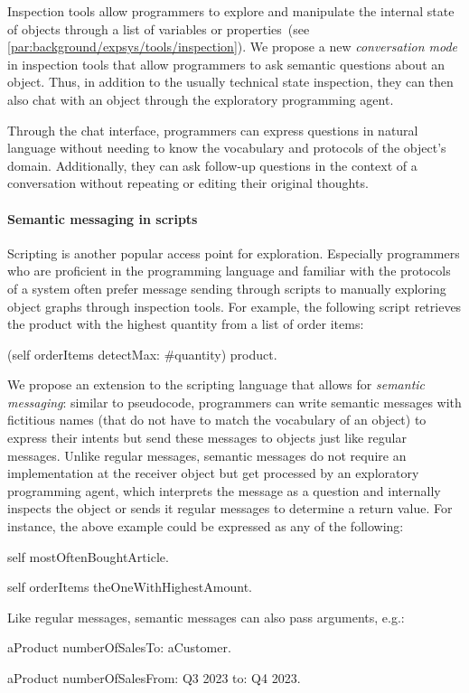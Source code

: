 Inspection tools allow programmers to explore and manipulate the internal state of objects through a list of variables or properties~(see \cref{par:background/expsys/tools/inspection}).
We propose a new \emph{conversation mode} in inspection tools that allow programmers to ask semantic questions about an object.
Thus, in addition to the usually technical state inspection, they can then also chat with an object through the exploratory programming agent.

Through the chat interface, programmers can express questions in natural language without needing to know the vocabulary and protocols of the object's domain.
Additionally, they can ask follow-up questions in the context of a conversation without repeating or editing their original thoughts.

\paragraph{Semantic messaging in scripts}
\label{par:design/agent/interfaces/messaging}

Scripting is another popular access point for exploration.
Especially programmers who are proficient in the programming language and familiar with the protocols of a system often prefer message sending through scripts to manually exploring object graphs through inspection tools.
For example, the following script retrieves the product with the highest quantity from a list of order items:

\begin{multicode}
	(self orderItems detectMax: \#quantity) product.
\end{multicode}

We propose an extension to the scripting language that allows for \emph{semantic messaging}: similar to pseudocode, programmers can write semantic messages with fictitious names (that do not have to match the vocabulary of an object) to express their intents but send these messages to objects just like regular messages.
Unlike regular messages, semantic messages do not require an implementation at the receiver object but get processed by an exploratory programming agent, which interprets the message as a question and internally inspects the object or sends it regular messages to determine a return value.
For instance, the above example could be expressed as any of the following:
\begin{multicode}
	self mostOftenBoughtArticle.

	self orderItems theOneWithHighestAmount.
\end{multicode}
Like regular messages, semantic messages can also pass arguments, e.g.:
\begin{multicode}
	aProduct numberOfSalesTo: aCustomer.

	aProduct numberOfSalesFrom: \textquotesingle Q3 2023\textquotesingle{} to: \textquotesingle Q4 2023\textquotesingle.
\end{multicode}

